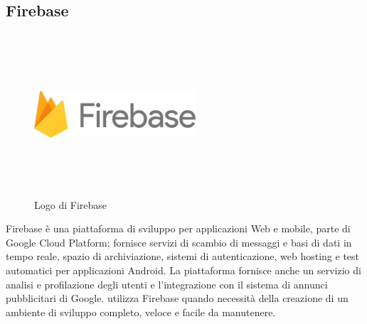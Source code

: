 \subsection{Firebase}
\begin{figure}[htbp]
   \begin{center}
      \includegraphics[width=6cm,height=6cm,keepaspectratio]{immagini/firebase-logo}
   \end{center}
   \caption{Logo di Firebase}
\end{figure}
Firebase è una piattaforma di sviluppo per applicazioni Web e mobile, parte di Google Cloud Platform; fornisce servizi di scambio di messaggi e basi di dati in tempo reale, spazio di archiviazione, sistemi di autenticazione, web hosting e test automatici per applicazioni Android. La piattaforma fornisce anche un servizio di analisi e profilazione degli utenti e l'integrazione con il sistema di annunci pubblicitari di Google.
\nomeAzienda{} utilizza Firebase quando necessità della creazione di un ambiente di sviluppo completo, veloce e facile da manutenere.


